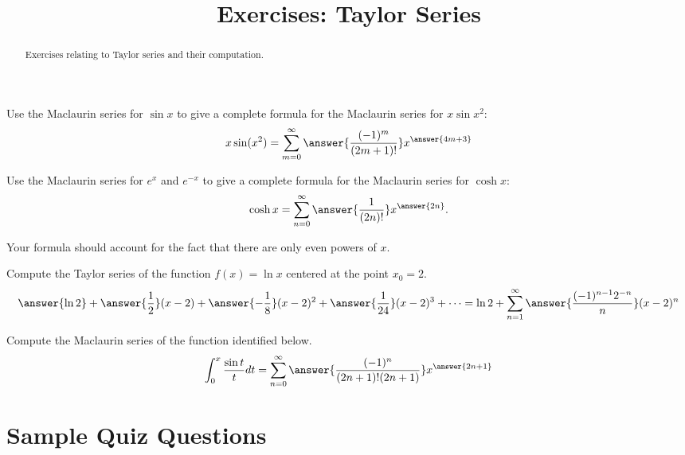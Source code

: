 \documentclass{ximera}
\title{Exercises: Taylor Series}
\begin{document}
\begin{abstract}
Exercises relating to Taylor series and their computation.
\end{abstract}
\maketitle


\begin{exercise}
Use the Maclaurin series for $\sin x$ to give a complete formula for the Maclaurin series for $x \sin x^2$:
\[ x \sin (x^2) = \sum_{m=0}^\infty  \answer{\frac{(-1)^m}{(2m+1)!}} x^{\answer{4m+3}} \]
\end{exercise}

\begin{exercise}
Use the Maclaurin series for $e^x$ and $e^{-x}$ to give a complete formula for the Maclaurin series for $\cosh x$:
\[ \cosh x = \sum_{n=0}^\infty \answer{\frac{1}{(2n)!}} x^{\answer{2n}}. \]
\begin{hint}
Your formula should account for the fact that there are only even powers of $x$.
\end{hint}
\end{exercise}

\begin{exercise}
Compute the Taylor series of the function $f(x) = \ln x$ centered at the point $x_0 = 2$.
\[ \answer{ \ln 2} + \answer{\frac{1}{2}} (x-2) + \answer{- \frac{1}{8}}(x-2)^2 + \answer{\frac{1}{24}}(x-2)^3 + \cdots = \ln 2 + \sum_{n=1}^\infty \answer{\frac{(-1)^{n-1}2^{-n}}{n}} (x-2)^n \]
\end{exercise}


\begin{exercise}
Compute the Maclaurin series of the function identified below.
\[ \int_0^x \frac{\sin t}{t} dt = \sum_{n=0}^\infty \answer{\frac{(-1)^n}{(2n+1)! (2n+1)}} x^{\answer{2n+1}} \]
\end{exercise}

\section*{Sample Quiz Questions}
\end{document}
